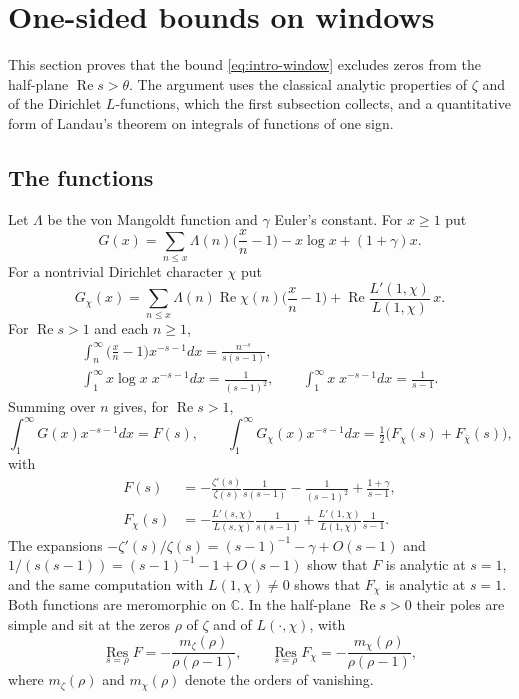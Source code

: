 \documentclass[11pt,letterpaper]{article}
\numberwithin{equation}{section}
\begin{document}
\section{One-sided bounds on windows}\label{sec:windows}

This section proves that the bound \eqref{eq:intro-window} excludes zeros from the half-plane $\operatorname{Re}s>\theta$. The argument uses the classical analytic properties of $\zeta$ and of the Dirichlet $L$-functions, which the first subsection collects, and a quantitative form of Landau's theorem on integrals of functions of one sign.

\subsection{The functions}\label{sec:functions}

Let $\Lambda$ be the von Mangoldt function and $\gamma$ Euler's constant. For $x\ge1$ put
\begin{equation}\label{G}
G(x)=\sum_{n\le x}\Lambda(n)\Big(\frac xn-1\Big)-x\log x+(1+\gamma)x .
\end{equation}
For a nontrivial Dirichlet character $\chi$ put
\begin{equation}\label{Gchi}
G_\chi(x)=\sum_{n\le x}\Lambda(n)\operatorname{Re}\chi(n)\Big(\frac xn-1\Big)+\operatorname{Re}\frac{L'(1,\chi)}{L(1,\chi)}\,x .
\end{equation}
For $\operatorname{Re}s>1$ and each $n\ge1$,
\begin{gather*}
\int_n^\infty\Big(\frac xn-1\Big)x^{-s-1}dx=\frac{n^{-s}}{s(s-1)},\\
\int_1^\infty x\log x\;x^{-s-1}dx=\frac1{(s-1)^2},\qquad
\int_1^\infty x\;x^{-s-1}dx=\frac1{s-1}.
\end{gather*}
Summing over $n$ gives, for $\operatorname{Re}s>1$,
\begin{equation}\label{F}
\int_1^\infty G(x)x^{-s-1}dx=F(s),\qquad \int_1^\infty G_\chi(x)x^{-s-1}dx=\tfrac12\big(F_\chi(s)+F_{\bar\chi}(s)\big),
\end{equation}
with
\begin{equation}\label{Fchi}
\begin{aligned}
F(s)&=-\frac{\zeta'(s)}{\zeta(s)}\frac1{s(s-1)}-\frac1{(s-1)^2}+\frac{1+\gamma}{s-1},\\
F_\chi(s)&=-\frac{L'(s,\chi)}{L(s,\chi)}\frac1{s(s-1)}+\frac{L'(1,\chi)}{L(1,\chi)}\frac1{s-1}.
\end{aligned}
\end{equation}
The expansions $-\zeta'(s)/\zeta(s)=(s-1)^{-1}-\gamma+O(s-1)$ and $1/(s(s-1))=(s-1)^{-1}-1+O(s-1)$ show that $F$ is analytic at $s=1$, and the same computation with $L(1,\chi)\ne0$ shows that $F_\chi$ is analytic at $s=1$. Both functions are meromorphic on $\mathbb C$. In the half-plane $\operatorname{Re}s>0$ their poles are simple and sit at the zeros $\rho$ of $\zeta$ and of $L(\cdot,\chi)$, with
\begin{equation}\label{res}
\operatorname*{Res}_{s=\rho}F=-\frac{m_\zeta(\rho)}{\rho(\rho-1)},\qquad \operatorname*{Res}_{s=\rho}F_\chi=-\frac{m_\chi(\rho)}{\rho(\rho-1)},
\end{equation}
where $m_\zeta(\rho)$ and $m_\chi(\rho)$ denote the orders of vanishing.
\end{document}
